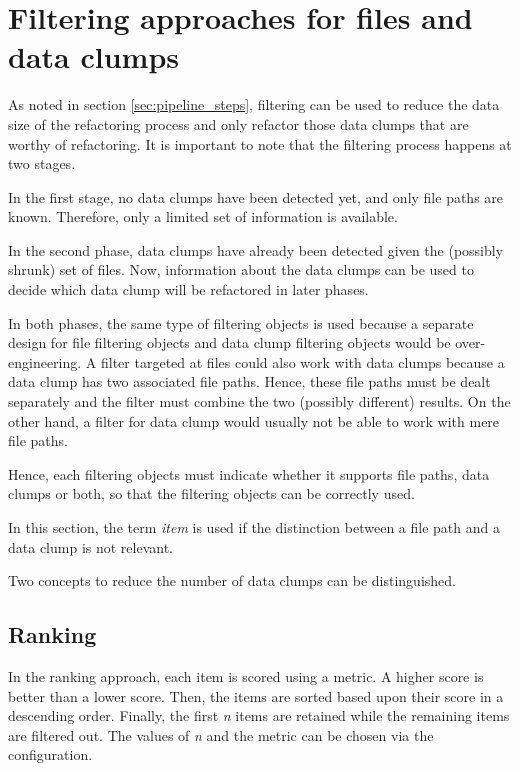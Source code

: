 \section{Filtering approaches for files and data clumps}
\label{sec:data_clump_filtering}

As noted in section \ref{sec:pipeline_steps}, filtering can be used to reduce the data size of the refactoring process and only refactor those data clumps that are worthy of refactoring. It is important to note that the filtering process happens at two stages.

In the first stage, no data clumps have been detected yet, and only file paths are known. Therefore, only a limited set of information is available. 

In the second phase, data clumps have already  been detected given the (possibly shrunk) set of files. Now, information about the data clumps can be used  to decide which data clump will be refactored in later phases.

In both phases, the same type of filtering objects is used because  a separate design for file filtering objects and data clump filtering objects would be over-engineering. A filter targeted at files could also work with data clumps because a data clump has two associated file paths. Hence, these file paths must be dealt separately and the filter must combine the two (possibly different) results. On the other hand, a filter for data clump would usually not be able to work with mere file paths.

Hence, each filtering objects must indicate whether it supports file paths, data clumps or both, so that the filtering objects can be correctly used. 

In this section, the term \textit{item} is used if the distinction between a file path and a data clump is not relevant. 

Two concepts to  reduce the number of data clumps can be distinguished.
\subsection{Ranking} \label{sec:metrics}
In the ranking approach, each item is scored using a metric. A higher score is better than a lower score.  Then, the items are sorted based upon their score in a descending order. Finally, the first  \textit{n} items are retained while the remaining items are filtered out. The values of \textit{n} and the metric can be chosen via the configuration. 

